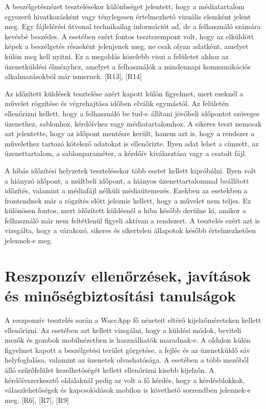 A beszélgetésnézet tesztelésekor különbséget jelentett, hogy a médiatartalom egyszerű hivatkozásként vagy ténylegesen értelmezhető vizuális elemként jelent meg. Egy fájlelérési útvonal technikailag információt ad, de a felhasználó számára kevésbé beszédes. A  esetében ezért fontos tesztszempont volt, hogy az elküldött képek a beszélgetés részeként jelenjenek meg, ne csak olyan adatként, amelyet külön meg kell nyitni. Ez a megoldás közelebb viszi a felületet ahhoz az üzenetküldési élményhez, amelyet a felhasználók a mindennapi kommunikációs alkalmazásokból már ismernek. [R13], [R14]

Az időzített küldések tesztelése azért kapott külön figyelmet, mert ezeknél a művelet rögzítése és végrehajtása időben elválik egymástól. Az  felületén ellenőrizni kellett, hogy a felhasználó be tud-e állítani jövőbeli időpontot szöveges üzenethez, sablonhoz, kérdőívhez vagy médiatartalomhoz. A sikeres teszt nemcsak azt jelentette, hogy az időpont mentésre került, hanem azt is, hogy a rendszer a művelethez tartozó kötelező adatokat is ellenőrizte. Ilyen adat lehet a címzett, az üzenettartalom, a sablonparaméter, a kérdőív kiválasztása vagy a csatolt fájl.

A hibás időzítési helyzetek tesztelésekor több esetet kellett kipróbálni. Ilyen volt a hiányzó időpont, a múltbeli időpont, a hiányos üzenettartalommal beállított időzítés, valamint a médiafájl nélküli médiaütemezés. Ezekben az esetekben a frontendnek már a rögzítés előtt jeleznie kellett, hogy a művelet nem teljes. Ez különösen fontos, mert időzített küldésnél a hiba később derülne ki, amikor a felhasználó már nem feltétlenül figyeli aktívan a rendszert. A tesztelés ezért azt is vizsgálta, hogy a várakozó, sikeres és sikertelen állapotok később értelmezhetően jelennek-e meg.

\section{Reszponzív ellenőrzések, javítások és minőségbiztosítási tanulságok}

A reszponzív tesztelés során a WaccApp fő nézeteit eltérő kijelzőméreteken kellett ellenőrizni. Az  esetében azt kellett vizsgálni, hogy a küldési módok, beviteli mezők és gombok mobilnézetben is használhatók maradnak-e. A  oldalon külön figyelmet kapott a beszélgetési terület görgetése, a fejléc és az üzenetküldő sáv helyfoglalása, valamint az üzenetek olvashatósága. A  esetében a több mezőből álló szűrőfelület kezelhetőségét kellett ellenőrizni kisebb kijelzőn. A kérdőívszerkesztő oldalaknál pedig az volt a fő kérdés, hogy a kérdésblokkok, válaszlehetőségek és kapcsolódások mobilon is követhető sorrendben jelennek-e meg. [R6], [R7], [R9]

